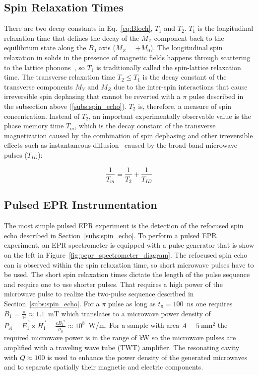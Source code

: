 \subsection{Spin Relaxation Times}
There are two decay constants in Eq.~\ref{eq:Bloch}, $T_1$ and $T_2$. $T_1$ is the longitudinal relaxation time that defines the decay of the $M_Z$ component back to the equilibrium state along the $B_0$ axis ($M_Z = +M_0$). The longitudinal spin relaxation in solids in the presence of magnetic fields happens through scattering to the lattice phonons~\cite{Lunghi2019}, so $T_1$ is traditionally called the spin-lattice relaxation time. The transverse relaxation time $T_2\leq T_1$ is the decay constant of the transverse components $M_Y$ and $M_Z$ due to the inter-spin interactions that cause irreversible spin dephasing that cannot be reverted with a $\pi$ pulse described in the subsection above (\ref{subs:spin_echo}). $T_2$ is, therefore, a measure of spin concentration. Instead of $T_2$, an important experimentally observable value is the phase memory time $T_m$, which is the decay constant of the transverse magnetization caused by the combination of spin dephasing and other irreversible effects such as instantaneous diffusion~\cite{Schweiger2001,Daniel2022} caused by the broad-band microwave pulses ($T_{ID}$):

\begin{equation}
\label{eq:Tm}
\frac{1}{T_m} = \frac{1}{T_2} + \frac{1}{T_{ID}}
\end{equation} 


\subsection{Pulsed EPR Instrumentation}
The most simple pulsed EPR experiment is the detection of the refocused spin echo described in Section~\ref{subs:spin_echo}. To perform a pulsed EPR experiment, an EPR spectrometer is equipped with a pulse generator that is show on the left in Figure~\ref{fig:pepr_spectrometer_diagram}. The refocused spin echo can is observed within the spin relaxation time, so short microwave pulses have to be used. The short spin relaxation times dictate the length of the pulse sequence and require one to use shorter pulses. That requires a high power of the microwave pulse to realize the two-pulse sequence described in Section~\ref{subs:spin_echo}. For a $\pi$ pulse as long as $t_{\pi}=100$~ns one requires $B_1=\frac{\pi}{\gamma t}\approx1.1$~mT which translates to a microwave power density of $P_A=\vec{E_1}\times\vec{H_1}=\frac{c{B_1}^2}{\mu_0}\approx10^8$~W/m. For a sample with area $A=5~$mm$^2$ the required microwave power is in the range of kW so the microwave pulses are amplified with a traveling wave tube (TWT) amplifier. The resonating cavity with $Q\approx100$ is used to enhance the power density of the generated microwaves and to separate spatially their magnetic and electric components.

